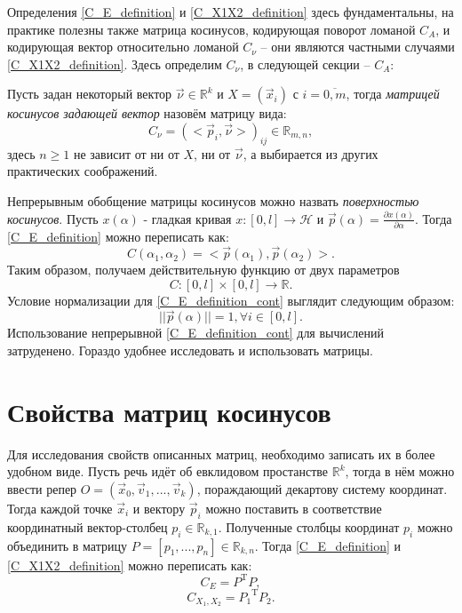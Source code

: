 Определения \ref{C_E_definition} и \ref{C_X1X2_definition} здесь фундаментальны, на практике полезны также матрица косинусов, кодирующая поворот ломаной $C_A$, и кодирующая вектор относительно ломаной ${C}_{\nu}$ -- они являются частными случаями \ref{C_X1X2_definition}. Здесь определим ${C}_{\nu}$, в следующей секции -- $C_A$:

Пусть задан некоторый вектор $\vec{\nu} \in \mathbb{R}^k$ и $X = (\vec{x}_{i})$ с $i = \overline{0,m}$, тогда \textit{матрицей косинусов задающей вектор} назовём матрицу вида:
\begin{equation}
	{C}_{\nu} = {(<\vec{p}_{i}, \vec{\nu}>)}_{ij} \in \mathbb{R}_{m,n},
	\label{C_nu_definition}
\end{equation}
здесь $n \ge 1$ не зависит от ни от $X$, ни от $\vec{\nu}$, а выбирается из других практических соображений.

Непрерывным обобщение матрицы косинусов можно назвать \textit{поверхностью косинусов}. Пусть $x(\alpha)$ - гладкая кривая $x : [0, l] \rightarrow \mathcal{H}$ и $\vec{p}(\alpha) = \frac{\partial{x(\alpha)}}{\partial{\alpha}}$. Тогда \ref{C_E_definition} можно переписать как:
\begin{equation}
	C({\alpha}_1, {\alpha}_2) = <\vec{p}(\alpha_1), \vec{p}(\alpha_2)>.
	\label{C_E_definition_cont}
\end{equation}
Таким образом, получаем действительную функцию от двух параметров \begin{equation}C : [0, l] \times [0, l] \rightarrow \mathbb{R}.\end{equation}
Условие нормализации для \ref{C_E_definition_cont} выглядит следующим образом:
\begin{equation}
	||\vec{p}(\alpha)|| = 1, \forall{i} \in [0, l].
	\label{normalized_definition_cont}
\end{equation}
Использование непрерывной \ref{C_E_definition_cont} для вычислений затруденено. Гораздо удобнее исследовать и использовать матрицы.

\section{Свойства матриц косинусов}
Для исследования свойств описанных матриц, необходимо записать их в более удобном виде. Пусть речь идёт об евклидовом простанстве $\mathbb{R}^{k}$, тогда в нём можно ввести репер
$O = (\vec{x}_0, \vec{v}_1, ..., \vec{v}_k)$, пораждающий декартову систему координат. Тогда каждой точке $\vec{x}_i$ и вектору $\vec{p}_i$ можно поставить в соответствие координатный вектор-столбец $p_i \in \mathbb{R}_{k,1}$. Полученные столбцы координат $p_i$ можно объединить в матрицу $P = [p_1, ..., p_n] \in \mathbb{R}_{k,n}$. Тогда \ref{C_E_definition} и \ref{C_X1X2_definition} можно переписать как:
\begin{equation}
	C_E = P^\mathrm{T}P,
	\label{C_E_calc}
\end{equation}
\begin{equation}
	C_{X_1, X_2} = {P_1}^\mathrm{T}{P_2}.
	\label{C_X1X2_calc}
\end{equation}

